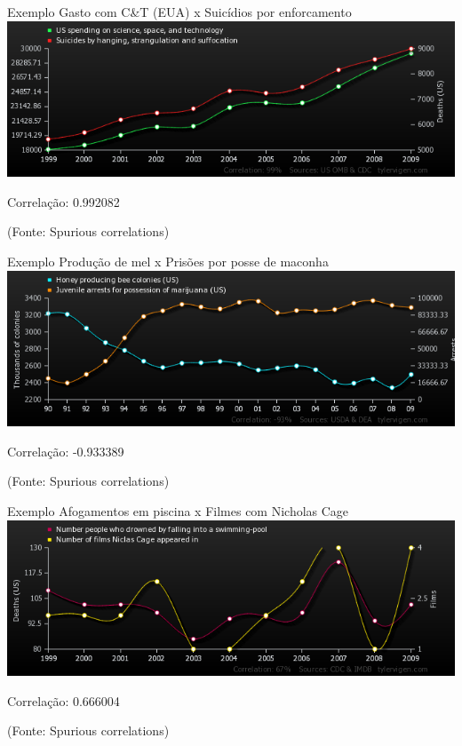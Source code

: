 \documentclass{beamer}
\begin{document}

\begin{frame}{Exemplo}
  Gasto com C\&T (EUA) x Suicídios por enforcamento
  \includegraphics[width=\textwidth]{Assoc/us-spending-on-science-space-and-technology_suicides-by-hanging-strangulation-and-suffocation}

  Correlação: 0.992082

  (Fonte: Spurious correlations)
\end{frame}

\begin{frame}{Exemplo}
  Produção de mel x Prisões por posse de maconha
  \includegraphics[width=\textwidth]{Assoc/honey-producing-bee-colonies-us_juvenile-arrests-for-possession-of-marijuana-us}

  Correlação: -0.933389

  (Fonte: Spurious correlations)
\end{frame}

\begin{frame}{Exemplo}
  Afogamentos em piscina x Filmes com Nicholas Cage
  \includegraphics[width=\textwidth]{Assoc/number-people-who-drowned-by-falling-into-a-swimming-pool_number-of-films-niclas-cage-appeared-in}

  Correlação: 0.666004

  (Fonte: Spurious correlations)
\end{frame}
\end{document}

